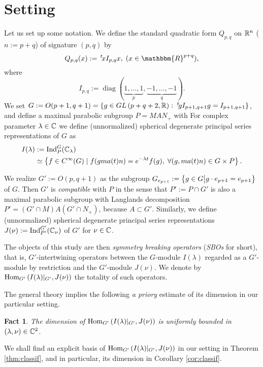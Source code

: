 \documentclass[12pt]{article} %
\newcommand{\assign}{:=}
\newcommand{\tmop}[1]{\ensuremath{\operatorname{#1}}}
\newcommand{\Hom}{\mbox{\normalfont Hom}}
\newcommand{\Ind}{\mbox{\normalfont Ind}}
\newtheorem{fact}{Fact}
\theoremstyle{definition}
\theoremstyle{exampstyle} \newtheorem{examp}[theorem]{Theorem}
\renewcommand{\Q}{Q_{p,q}}
\newcommand{\IlambdaGprime}{I(\lambda)\kern-0.3em\mid_{G'}}
\newcommand{\SBO}{\Hom_{G'}\left(\IlambdaGprime,J(\nu) \right)}
\begin{document}
  \section{Setting}
  \begin{versiona}
	  Let us set up some notation. We define the standard quadratic form
	  $\Q$ on $\mathbb{R}^n$ ($n:=p+q$) of signature $(p,q)$ by
	  \begin{equation*}
  \Q (x) \assign \,^t \! x I_{p, q} x, \; (x \in
  \mathbbm{R}^{p + q}),
	  \end{equation*}
	  where
\begin{equation*}
   I_{p, q} \assign \tmop{diag} (\underbrace{1, \ldots, 1}_p, \underbrace{-
  1, \ldots, - 1}_q).
\end{equation*}
We set $G \assign O (p +
1, q + 1)=\left\{ g\in GL\left( p+q+2,\R \right):\;^t\!gI_{p+1,q+1}g=I_{p+1,q+1} \right\}$, and define
a maximal parabolic subgroup $P=MAN_{+}$ with
For complex parameter $\lambda\in\mathbb{C}$ we define (unnormalized) spherical degenerate principal series representations of $G$ as
\begin{align*}
I(\lambda)&:=\Ind_P^G(\C_\lambda)\\
&\simeq \left\{ f\in C^{\infty}(G)\mid f(gma(t)n)=e^{-\lambda t}f(g),\;\forall(g,ma(t)n)\in G\times P \right\}.
\end{align*}

We realize $G':=O(p,q+1)$ as the subgroup $G_{e_{p+1}}:=\left\{g \in G\big| g \cdot e_{p + 1} = e_{p + 1}\right\}$ of $G$. 
Then $G'$ is {\it compatible} with $P$ in the sense that 
$P':=P\cap G'$ is also a maximal parabolic subgroup
with Langlands decomposition $P'=(G'\cap M)A (G'\cap N_+)$,
because $A\subset G'$.
Similarly, we define (unnormalized) spherical degenerate principal series representations $J(\nu):=\Ind_{P'}^{G'}(\C_{\nu})$ of $G'$ for $\nu\in\mathbb{C}$.

The objects of this study are then \textit{symmetry breaking operators} (\textit{SBOs} for short),
that is, $G'$-intertwining operators between the $G$-module $I(\lambda)$ regarded as a $G'$-module by restriction and the $G'$-module $J(\nu)$. We denote by $\SBO$ the totality
of such operators.

The general theory \cite{kobayashi2013finite,kobayashi2014classification} implies the following {\it a priory} estimate of its dimension in our particular setting.
\begin{fact}
	The dimension of $\SBO$ is uniformly bounded in $(\lambda,\nu)\in\mathbb{C}^2$.
\end{fact}
We shall find an explicit basis of $\SBO$ in our setting in Theorem \ref{thm:classif}, and in particular, its dimension in Corollary \ref{cor:classif}.


\end{versiona}
\end{document}

